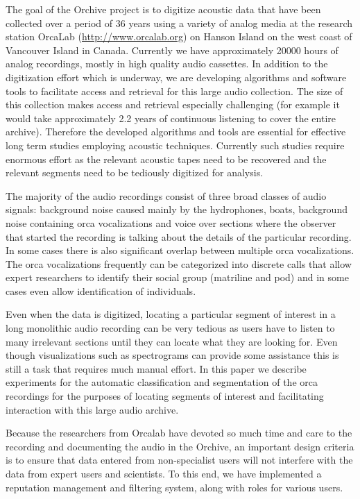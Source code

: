 \documentclass[12pt,oneside]{book}
\begin{document}
The goal of the Orchive project is to digitize acoustic data that have
been collected over a period of 36 years using a variety of analog
media at the research station OrcaLab (\url{http://www.orcalab.org}) on
Hanson Island on the west coast of Vancouver Island in
Canada. Currently we have approximately 20000 hours of analog
recordings, mostly in high quality audio cassettes. In addition to the
digitization effort which is underway, we are developing algorithms and
software tools to facilitate access and retrieval for this large audio
collection.  The size of this collection makes access and retrieval
especially challenging (for example it would take approximately 2.2
years of continuous listening to cover the entire archive).  Therefore
the developed algorithms and tools are essential for effective long
term studies employing acoustic techniques. Currently such studies
require enormous effort as the relevant acoustic tapes need to be
recovered and the relevant segments need to be tediously digitized
for analysis.

The majority of the audio recordings consist of three broad classes of
audio signals: background noise caused mainly by the hydrophones,
boats, background noise containing orca vocalizations and voice
over sections where the observer that started the recording is talking
about the details of the particular recording. In some cases there is
also significant overlap between multiple orca vocalizations. The orca
vocalizations frequently can be categorized into discrete calls that
allow expert researchers to identify their social group (matriline and
pod) and in some cases even allow identification of individuals.

Even when the data is digitized, locating a particular segment of
interest in a long monolithic audio recording can be very tedious as
users have to listen to many irrelevant sections until they can
locate what they are looking for. Even though visualizations such as
spectrograms can provide some assistance this is still a task that requires much
manual effort. In this paper we describe experiments for the automatic
classification and segmentation of the orca recordings for the
purposes of locating segments of interest and facilitating interaction
with this large audio archive.

Because the researchers from Orcalab have devoted so much time and
care to the recording and documenting the audio in the Orchive, an
important design criteria is to ensure that data entered from
non-specialist users will not interfere with the data from expert
users and scientists.  To this end, we have implemented a reputation
management and filtering system, along with roles for various users.
\end{document}
